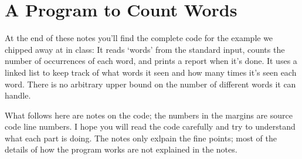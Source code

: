 \section{A Program to Count Words}

At the end of these notes you'll find the complete code for the example
we chipped away at in class: It reads `words' from the standard input,
counts the number of occurrences of each word, and prints a report when
it's done.  It uses a linked list to keep track of what words it seen
and how many times it's seen each word.  There is no arbitrary upper
bound on the number of different words it can handle.

What follows here are notes on the code; the numbers in the margins are
source code line numbers.  I hope you will read the code carefully and
try to understand what each part is doing.  The notes only exlpain the
fine points; most of the details of how the program works are not
explained in the notes.  

